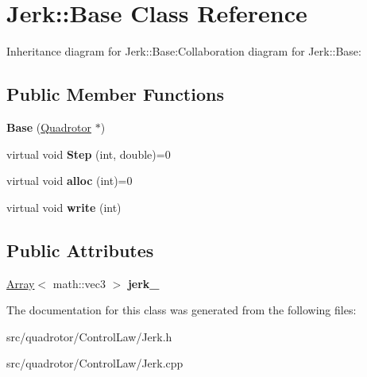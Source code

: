 \hypertarget{classJerk_1_1Base}{
\section{Jerk::Base Class Reference}
\label{classJerk_1_1Base}
}
Inheritance diagram for Jerk::Base:Collaboration diagram for Jerk::Base:\subsection*{Public Member Functions}
\begin{DoxyCompactItemize}
\item 
\hypertarget{classJerk_1_1Base_a626934eaadb98821638f7e372a4d3268}{
{\bfseries Base} (\hyperlink{classQuadrotor}{Quadrotor} $\ast$)}
\label{classJerk_1_1Base_a626934eaadb98821638f7e372a4d3268}

\item 
\hypertarget{classJerk_1_1Base_ac1207a2bf6d282ef432c072f99f57ef9}{
virtual void {\bfseries Step} (int, double)=0}
\label{classJerk_1_1Base_ac1207a2bf6d282ef432c072f99f57ef9}

\item 
\hypertarget{classJerk_1_1Base_aaa5aed35c31b51ef88dfcf82dc5c5f19}{
virtual void {\bfseries alloc} (int)=0}
\label{classJerk_1_1Base_aaa5aed35c31b51ef88dfcf82dc5c5f19}

\item 
\hypertarget{classJerk_1_1Base_ada482e98d0fe0542ce063a7413100f8f}{
virtual void {\bfseries write} (int)}
\label{classJerk_1_1Base_ada482e98d0fe0542ce063a7413100f8f}

\end{DoxyCompactItemize}
\subsection*{Public Attributes}
\begin{DoxyCompactItemize}
\item 
\hypertarget{classJerk_1_1Base_ae888b2ce4264998d26bb0bbfce51b5e7}{
\hyperlink{classArray}{Array}$<$ math::vec3 $>$ {\bfseries jerk\_\-}}
\label{classJerk_1_1Base_ae888b2ce4264998d26bb0bbfce51b5e7}

\end{DoxyCompactItemize}


The documentation for this class was generated from the following files:\begin{DoxyCompactItemize}
\item 
src/quadrotor/ControlLaw/Jerk.h\item 
src/quadrotor/ControlLaw/Jerk.cpp\end{DoxyCompactItemize}
